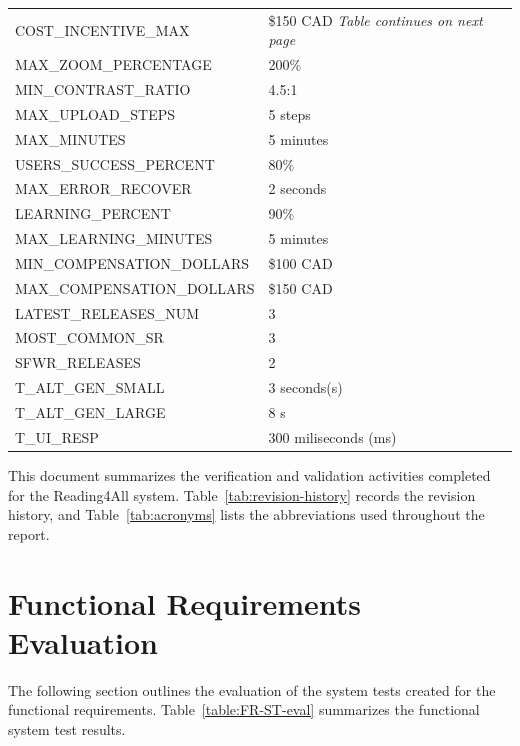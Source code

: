 \documentclass[12pt, titlepage]{article}
\begin{document}
\begin{longtable}{|p{8.0cm}|p{8.0cm}|}
  COST\_INCENTIVE\_MAX & \$150 CAD \qquad\textit{Table continues on next page}\\
  MAX\_ZOOM\_PERCENTAGE & 200\% \\
  MIN\_CONTRAST\_RATIO & 4.5:1\\
  MAX\_UPLOAD\_STEPS & 5 steps\\
  MAX\_MINUTES & 5 minutes\\
  USERS\_SUCCESS\_PERCENT & 80\%\\
  MAX\_ERROR\_RECOVER & 2 seconds \\
  LEARNING\_PERCENT & 90\% \\
  MAX\_LEARNING\_MINUTES & 5 minutes \\
  MIN\_COMPENSATION\_DOLLARS & \$100 CAD \\
  MAX\_COMPENSATION\_DOLLARS & \$150 CAD \\
  LATEST\_RELEASES\_NUM & 3 \\
  MOST\_COMMON\_SR & 3 \\
  SFWR\_RELEASES & 2 \\
  T\_ALT\_GEN\_SMALL & 3 seconds(s) \\
  T\_ALT\_GEN\_LARGE & 8 s \\
  T\_UI\_RESP & 300 miliseconds (ms) \\

  \bottomrule
\end{longtable}
\newpage

\tableofcontents

\listoftables %

\listoffigures %

\newpage

\setlength{\LTleft}{0pt}
\setlength{\LTright}{0pt}
\small

This document summarizes the verification and validation activities
completed for the Reading4All system.
Table~\ref{tab:revision-history} records the revision history, and
Table~\ref{tab:acronyms} lists the abbreviations used throughout the report.

\section{Functional Requirements Evaluation}
The following section outlines the evaluation of the system tests
created for the
functional requirements. Table~\ref{table:FR-ST-eval} summarizes the
functional system test results.

\newcommand{\testcount}{\stepcounter{testcase}\thetestcase}
\end{document}
